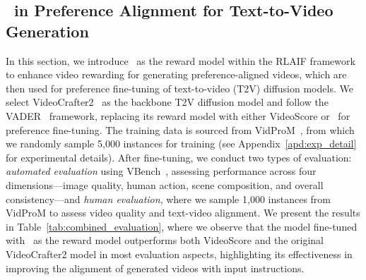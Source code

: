 \subsection{\algname\ in Preference Alignment for Text-to-Video Generation}
In this section, we introduce \algname\ as the reward model within the RLAIF framework to enhance video rewarding for generating preference-aligned videos, which are then used for preference fine-tuning of text-to-video (T2V) diffusion models. We select VideoCrafter2~\cite{chen2024videocrafter2} as the backbone T2V diffusion model and follow the VADER~\cite{prabhudesai2024videodiffusionalignmentreward} framework, replacing its reward model with either VideoScore or \algname\ for preference fine-tuning. The training data is sourced from VidProM~\cite{wang2024vidprom}, from which we randomly sample 5,000 instances for training (see Appendix~\ref{apd:exp_detail} for experimental details). After fine-tuning, we conduct two types of evaluation: \textit{automated evaluation} using VBench~\cite{huang2023vbench}, assessing performance across four dimensions—image quality, human action, scene composition, and overall consistency—and \textit{human evaluation}, where we sample 1,000 instances from VidProM to assess video quality and text-video alignment. We present the results in Table~\ref{tab:combined_evaluation}, where we observe that the model fine-tuned with \algname\ as the reward model outperforms both VideoScore and the original VideoCrafter2 model in most evaluation aspects, highlighting its effectiveness in improving the alignment of generated videos with input instructions.







